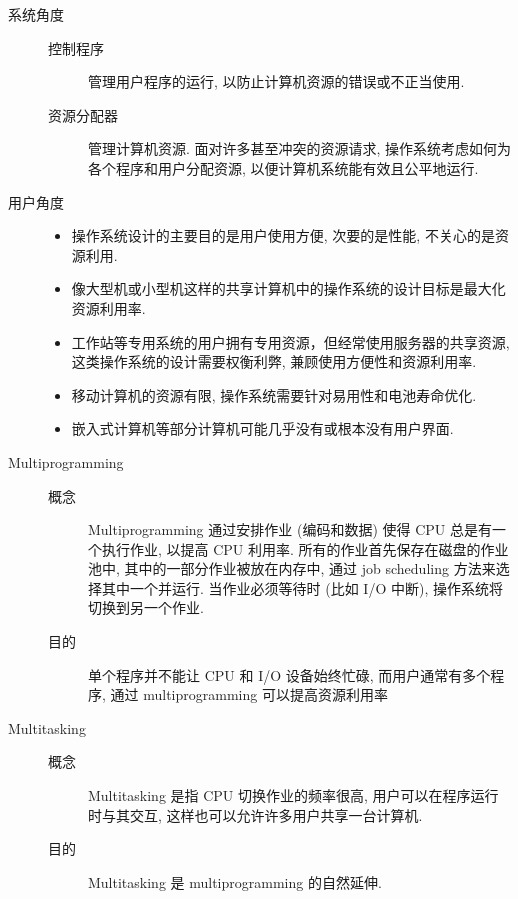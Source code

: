\documentclass[11pt]{homework}
\begin{document}
\maketitle
\question
\begin{description}
    \item[系统角度] \hfill
    \begin{description}
        \item[控制程序] 管理用户程序的运行, 以防止计算机资源的错误或不正当使用.
        \item[资源分配器] 管理计算机资源. 面对许多甚至冲突的资源请求, 操作系统考虑如何为各个程序和用户分配资源, 以便计算机系统能有效且公平地运行.
    \end{description}
    \item[用户角度] \hfill
    \begin{itemize}
        \item 操作系统设计的主要目的是用户使用方便, 次要的是性能, 不关心的是资源利用.
        \item 像大型机或小型机这样的共享计算机中的操作系统的设计目标是最大化资源利用率.
        \item 工作站等专用系统的用户拥有专用资源，但经常使用服务器的共享资源, 这类操作系统的设计需要权衡利弊, 兼顾使用方便性和资源利用率.
        \item 移动计算机的资源有限, 操作系统需要针对易用性和电池寿命优化.
        \item 嵌入式计算机等部分计算机可能几乎没有或根本没有用户界面.
    \end{itemize}
\end{description}
\question
\begin{description}
    \item[Multiprogramming] \hfill
    \begin{description}
        \item[概念] Multiprogramming 通过安排作业 (编码和数据) 使得 CPU 总是有一个执行作业, 以提高 CPU 利用率. 所有的作业首先保存在磁盘的作业池中, 其中的一部分作业被放在内存中, 通过 job scheduling 方法来选择其中一个并运行. 当作业必须等待时 (比如 I/O 中断), 操作系统将切换到另一个作业.
        \item[目的] 单个程序并不能让 CPU 和 I/O 设备始终忙碌, 而用户通常有多个程序, 通过 multiprogramming 可以提高资源利用率
    \end{description} 
    \item[Multitasking] \hfill
    \begin{description}
        \item[概念] Multitasking 是指 CPU 切换作业的频率很高, 用户可以在程序运行时与其交互, 这样也可以允许许多用户共享一台计算机.
        \item[目的] Multitasking 是 multiprogramming 的自然延伸.  
    \end{description} 
\end{description}
\end{document}
